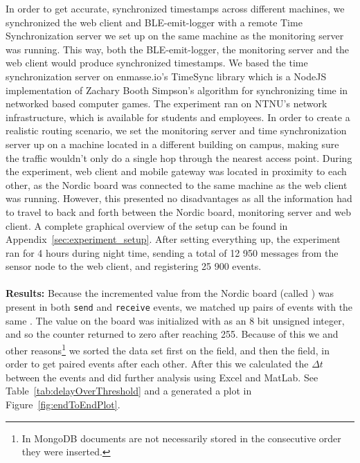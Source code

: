 In order to get accurate, synchronized timestamps across different machines, we synchronized the web client and BLE-emit-logger with a remote Time Synchronization server we set up on the same machine as the monitoring server was running. This way, both the BLE-emit-logger, the monitoring server and the web client would produce synchronized timestamps. We based the time synchronization server on enmasse.io's TimeSync library\cite{timesync} which is a NodeJS implementation of Zachary Booth Simpson's algorithm for synchronizing time in networked based computer games\cite{timesync:algo}. The experiment ran on NTNU's network infrastructure, which is available for students and employees. In order to create a realistic routing scenario, we set the monitoring server and time synchronization server up on a machine located in a different building on campus, making sure the traffic wouldn't only do a single hop through the nearest access point. During the experiment, web client and mobile gateway was located in proximity to each other, as the Nordic board was connected to the same machine as the web client was running. However, this presented no disadvantages as all the information had to travel to back and forth between the Nordic board, monitoring server and web client. A complete graphical overview of the setup can be found in Appendix~\ref{sec:experiment_setup}. After setting everything up, the experiment ran for 4 hours during night time, sending a total of 12 950 messages from the sensor node to the web client, and registering 25 900 events.
\\
\\
\noindent
\textbf{Results:} 
Because the incremented value from the Nordic board (called ) was present in both \texttt{send} and \texttt{receive} events, we matched up pairs of events with the same . The value on the board was initialized with as an 8 bit unsigned integer, and so the counter returned to zero after reaching 255. Because of this we and other reasons\footnote{ In MongoDB documents are not necessarily stored in the consecutive order they were inserted.} we sorted the data set first on the  field, and then the  field, in order to get paired events after each other. After this we calculated the $\Delta t$ between the events and did further analysis using Excel and MatLab. See Table~\ref{tab:delayOverThreshold} and a generated a plot in Figure~\ref{fig:endToEndPlot}.

